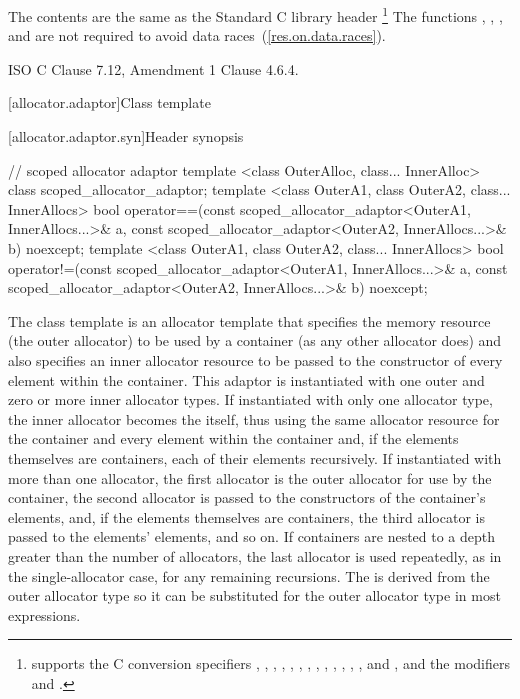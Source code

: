 \pnum
The contents are the same as the Standard C library header
\footnote{ supports the C conversion specifiers
, , , , , , ,
, , , , , , and
, and the modifiers  and .}
The functions , , , and
 are not required to avoid data
races~(\ref{res.on.data.races}).

\xref
ISO C Clause 7.12, Amendment 1 Clause 4.6.4.

[allocator.adaptor]{Class template }

[allocator.adaptor.syn]{Header  synopsis}

%
\begin{codeblock}
  // scoped allocator adaptor
  template <class OuterAlloc, class... InnerAlloc>
    class scoped_allocator_adaptor;
  template <class OuterA1, class OuterA2, class... InnerAllocs>
    bool operator==(const scoped_allocator_adaptor<OuterA1, InnerAllocs...>& a,
                    const scoped_allocator_adaptor<OuterA2, InnerAllocs...>& b) noexcept;
  template <class OuterA1, class OuterA2, class... InnerAllocs>
    bool operator!=(const scoped_allocator_adaptor<OuterA1, InnerAllocs...>& a,
                    const scoped_allocator_adaptor<OuterA2, InnerAllocs...>& b) noexcept;
\end{codeblock}

\pnum
The class template  is an allocator template that
specifies the memory resource (the outer allocator) to be used by a container (as any
other allocator does) and also specifies an inner allocator resource to be passed to the
constructor of every element within the container. This adaptor is instantiated with one
outer and zero or more inner allocator types. If instantiated with only one allocator
type, the inner allocator becomes the  itself, thus
using the same allocator resource for the container and every element within the
container and, if the elements themselves are containers, each of their elements
recursively. If instantiated with more than one allocator, the first allocator is the
outer allocator for use by the container, the second allocator is passed to the
constructors of the container's elements, and, if the elements themselves are
containers, the third allocator is passed to the elements' elements, and so on. If
containers are nested to a depth greater than the number of allocators, the last
allocator is used repeatedly, as in the single-allocator case, for any remaining
recursions. \enternote The  is derived from the outer
allocator type so it can be substituted for the outer allocator type in most
expressions. \exitnote

